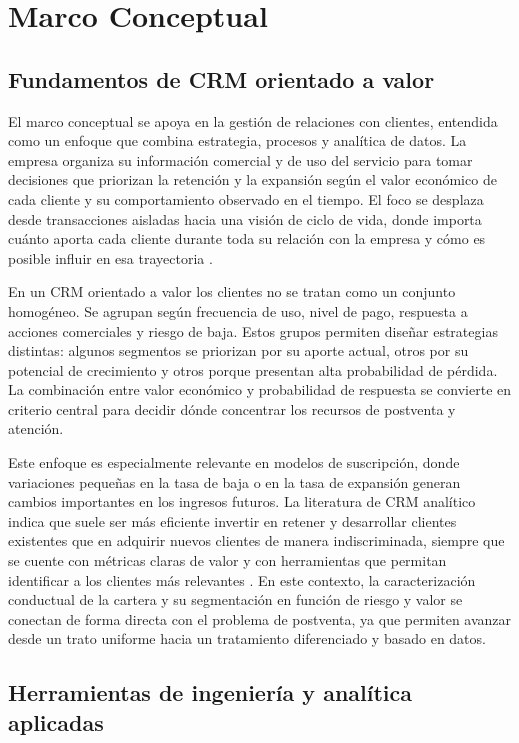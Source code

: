 \section{Marco Conceptual}

\subsection{Fundamentos de CRM orientado a valor}

El marco conceptual se apoya en la gestión de relaciones con clientes, entendida como un enfoque que combina estrategia, procesos y analítica de datos. La empresa organiza su información comercial y de uso del servicio para tomar decisiones que priorizan la retención y la expansión según el valor económico de cada cliente y su comportamiento observado en el tiempo. El foco se desplaza desde transacciones aisladas hacia una visión de ciclo de vida, donde importa cuánto aporta cada cliente durante toda su relación con la empresa y cómo es posible influir en esa trayectoria \citep{Kumar2010}.

En un CRM orientado a valor los clientes no se tratan como un conjunto homogéneo. Se agrupan según frecuencia de uso, nivel de pago, respuesta a acciones comerciales y riesgo de baja. Estos grupos permiten diseñar estrategias distintas: algunos segmentos se priorizan por su aporte actual, otros por su potencial de crecimiento y otros porque presentan alta probabilidad de pérdida. La combinación entre valor económico y probabilidad de respuesta se convierte en criterio central para decidir dónde concentrar los recursos de postventa y atención.

Este enfoque es especialmente relevante en modelos de suscripción, donde variaciones pequeñas en la tasa de baja o en la tasa de expansión generan cambios importantes en los ingresos futuros. La literatura de CRM analítico indica que suele ser más eficiente invertir en retener y desarrollar clientes existentes que en adquirir nuevos clientes de manera indiscriminada, siempre que se cuente con métricas claras de valor y con herramientas que permitan identificar a los clientes más relevantes \citep{Kumar2010,Gupta2006}. En este contexto, la caracterización conductual de la cartera y su segmentación en función de riesgo y valor se conectan de forma directa con el problema de postventa, ya que permiten avanzar desde un trato uniforme hacia un tratamiento diferenciado y basado en datos.

\subsection{Herramientas de ingeniería y analítica aplicadas}

